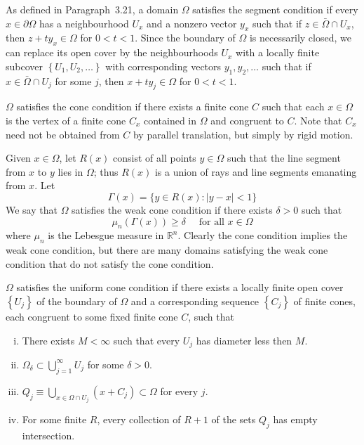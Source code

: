 \begin{para}
  As defined in Paragraph~3.21, a domain $\Omega$ satisfies the segment condition
  if every $x \in\partial\Omega$ has a neighbourhood $U_x$ and a nonzero vector $y_x$
  such that if $z \in \bar{\Omega} \cap U_x$, then $z+t y_x \in \Omega$ for $0<t<1$.
  Since the boundary of $\Omega$ is necessarily closed, we can replace its open cover by the 
  neighbourhoods $U_x$ with a locally finite subcover $\left\{U_1, U_2, \ldots\right\}$ with 
  corresponding vectors $y_1, y_2, \ldots$ such that if $x \in \bar{\Omega} \cap U_j$ for some 
  $j$, then $x+t y_j \in \Omega$ for $0<t<1$.
\end{para}


\begin{para}
  $\Omega$ satisfies the cone condition if there exists a finite cone $C$ such that
  each $x \in \Omega$ is the vertex of a finite cone $C_x$ contained in $\Omega$
  and congruent to $C$. Note that $C_x$ need not be obtained from $C$ by parallel translation,
  but simply by rigid motion.
\end{para}


\begin{para}
  Given $x \in \Omega$, let $R(x)$ consist of all points $y \in \Omega$ such that the line segment from $x$ to $y$ lies in $\Omega$; thus $R(x)$ is a union of rays and line segments emanating from $x$. Let
  \[
  \Gamma(x)=\{y \in R(x):|y-x|<1\}
  \]
  We say that $\Omega$ satisfies the weak cone condition if there exists $\delta>0$ such that
  \[
  \mu_n(\Gamma(x)) \geq \delta \quad \text { for all } x \in \Omega
  \]
  where $\mu_n$ is the Lebesgue measure in $\mathbb{R}^n$. Clearly the cone condition implies the 
  weak cone condition, but there are many domains satisfying the weak cone condition that do not 
  satisfy the cone condition.
\end{para}


\begin{para}
  $\Omega$ satisfies the uniform cone condition if there exists a locally finite open cover
  $\left\{U_j\right\}$ of the boundary of $\Omega$ and a corresponding sequence
  $\left\{C_j\right\}$ of finite cones, each congruent to some fixed finite cone $C$, such that
  \begin{enumerate}[(i)]
    \item There exists $M<\infty$ such that every $U_j$ has diameter less then $M$.
    \item $\Omega_\delta \subset \bigcup_{j=1}^{\infty} U_j$ for some $\delta>0$.
    \item $Q_j \equiv \bigcup_{x \in \Omega \cap U_j}\left(x+C_j\right) \subset \Omega$
      for every $j$.
    \item For some finite $R$, every collection of $R+1$ of the sets $Q_j$ has empty intersection.
  \end{enumerate}
\end{para}


